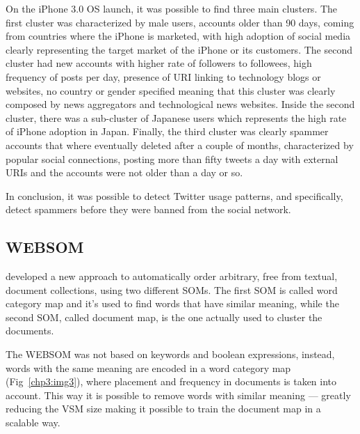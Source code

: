On the iPhone 3.0 OS launch, it was possible to find three main clusters. The first cluster was characterized by male users, accounts older than 90 days, coming from countries where the iPhone is marketed, with high adoption of social media clearly representing the target market of the iPhone or its customers. The second cluster had new accounts with higher rate of followers to followees, high frequency of posts per day, presence of URI linking to technology blogs or websites, no country or gender specified meaning that this cluster was clearly composed by news aggregators and technological news websites. Inside the second cluster, there was a sub-cluster of Japanese users which represents the high rate of iPhone adoption in Japan. Finally, the third cluster was clearly spammer accounts that where eventually deleted after a couple of months, characterized by popular social connections, posting more than fifty tweets a day with external URIs and the accounts were not older than a day or so.

In conclusion, it was possible to detect Twitter usage patterns, and specifically, detect spammers before they were banned from the social network. 

\subsection{WEBSOM}
\label{sub:websom}
\citet{honkelawebsom} developed a new approach to automatically order arbitrary, free from textual, document collections, using two different SOMs. The first \ac{SOM} is called word category map and it's used to find words that have similar meaning, while the second \ac{SOM}, called document map, is the one actually used to cluster the documents. 

The WEBSOM was not based on keywords and boolean expressions, instead, words with the same meaning are encoded in a word category map (Fig~\ref{chp3:img3}), where placement and frequency in documents is taken into account. This way it is possible to remove words with similar meaning --- greatly reducing the \ac{VSM} size  making it possible to train the document map in a scalable way.
                                                                                                          
